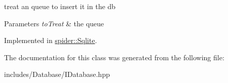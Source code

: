 treat an queue to insert it in the db 


\begin{DoxyParams}{Parameters}
{\em to\+Treat} & the queue \\
\hline
\end{DoxyParams}


Implemented in \hyperlink{classspider_1_1_sqlite_a3f2bc8e3e6eae99b7e2d4e9d9f6e0e94}{spider\+::\+Sqlite}.



The documentation for this class was generated from the following file\+:\begin{DoxyCompactItemize}
\item 
includes/\+Database/I\+Database.\+hpp\end{DoxyCompactItemize}
